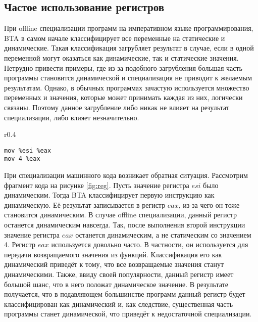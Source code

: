 \subsection{Частое использование регистров}
\label{part:4.1}
При offline специализации программ на императивном языке программирования, BTA в самом начале классифицирует все переменные на статические и динамические. Такая классификация загрубляет результат в случае, если в одной переменной могут оказаться как динамические, так и статические значения. Нетрудно привести примеры, где из-за подобного загрубления большая часть программы становится динамической и специализация не приводит к желаемым результатам. Однако, в обычных программах зачастую используется множество переменных и значения, которые может принимать каждая из них, логически связаны. Поэтому данное загрубление либо никак не влияет на результат специализации, либо влияет незначительно.

\begin{wrapfigure}{r}{0.4\textwidth}
\begin{lstlisting}[xleftmargin = 20pt]
mov %esi %eax
mov 4 %eax
\end{lstlisting}
\caption{Фрагмент кода}
\label{fig:reg}
\end{wrapfigure}
При специализации машинного кода возникает обратная ситуация. Рассмотрим фрагмент кода на рисунке \ref{fig:reg}. Пусть значение регистра $esi$ было динамическим. Тогда BTA классифицирует первую инструкцию как динамическую. Её результат записывается в регистр $eax$, из-за чего он тоже становится динамическим. В случае offline специализации, данный регистр останется динамическим навсегда. Так, после выполнения второй инструкции значение регистра $eax$ останется динамическим, а не статическим со значением 4. Регистр $eax$ используется довольно часто. В частности, он используется для передачи возвращаемого значения из функций. Классификация его как динамический приведёт к тому, что все возвращаемые значения станут динамическими. Также, ввиду своей популярности, данный регистр имеет большой шанс, что в него положат динамическое значение. В результате получается, что в подавляющем большинстве программ данный регистр будет классифицирован как динамический и, как следствие, существенная часть программы станет динамической, что приведёт к недостаточной специализации.


